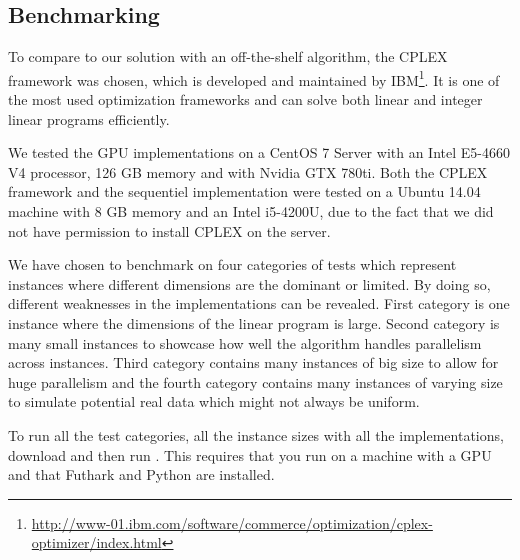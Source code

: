 \subsection{Benchmarking}
To compare to our solution with an off-the-shelf algorithm, the CPLEX framework was chosen, which is developed and maintained by IBM\footnote{\url{http://www-01.ibm.com/software/commerce/optimization/cplex-optimizer/index.html}}. It is one of the most used optimization frameworks and can solve both linear and integer linear programs efficiently.

We tested the GPU implementations on a CentOS 7 Server with an Intel E5-4660 V4 processor, 126 GB memory and with Nvidia GTX 780ti. Both the CPLEX framework and the sequentiel 
implementation were tested on a Ubuntu 14.04 machine with 8 GB memory and an Intel i5-4200U, due to the fact that we did not have permission to install CPLEX on the server.

\newpar We have chosen to benchmark on four categories of tests which represent instances where different dimensions are the dominant or limited. By doing so, different weaknesses in the implementations can be revealed. First category is one instance where the dimensions of the linear program is large. Second category is many small instances to showcase how well the algorithm handles parallelism across instances. Third category contains many instances of big size to allow for huge parallelism and the fourth category contains many instances of varying size to simulate potential real data which might not always be uniform.

\newpar To run all the test categories, all the instance sizes with all the implementations, download  and then run . This requires that you run on a machine with a GPU and that Futhark and Python are installed.